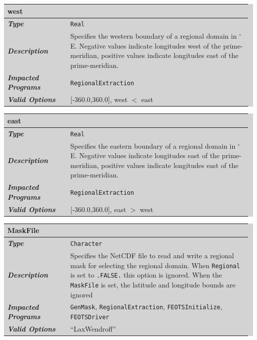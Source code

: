 \documentclass{softwaremanual}
\begin{document}

\noindent\begingroup\setlength{\fboxsep}{0pt}
\colorbox{lightgray}{
\begin{tabular}{p{0.25\linewidth} p{0.725\linewidth}}
\toprule
\textbf{west} & \\
\midrule
\textbf{\textit{Type}} & \texttt{Real} \\
\midrule
\textbf{\textit{Description}} & Specifies the western boundary of a regional domain in $^\circ$E. Negative values indicate longitudes west of the prime-meridian, positive values indicate longitudes east of the prime-meridian. \\
\midrule
\textbf{\textit{Impacted Programs}} & \texttt{RegionalExtraction} \\
\midrule
\textbf{\textit{Valid Options}}  & [-360.0,360.0], west $<$ east \\
\bottomrule
\end{tabular}
}\endgroup


\noindent\begingroup\setlength{\fboxsep}{0pt}
\colorbox{lightgray}{
\begin{tabular}{p{0.25\linewidth} p{0.725\linewidth}}
\toprule
\textbf{east} & \\
\midrule
\textbf{\textit{Type}} & \texttt{Real} \\
\midrule
\textbf{\textit{Description}} & Specifies the eastern boundary of a regional domain in $^\circ$E. Negative values indicate longitudes east of the prime-meridian, positive values indicate longitudes east of the prime-meridian. \\
\midrule
\textbf{\textit{Impacted Programs}} & \texttt{RegionalExtraction} \\
\midrule
\textbf{\textit{Valid Options}}  & [-360.0,360.0], east $>$ west \\
\bottomrule
\end{tabular}
}\endgroup

\noindent\begingroup\setlength{\fboxsep}{0pt}
\colorbox{lightgray}{
\begin{tabular}{p{0.25\linewidth} p{0.725\linewidth}}
\toprule
\textbf{MaskFile} & \\
\midrule
\textbf{\textit{Type}} & \texttt{Character} \\
\midrule
\textbf{\textit{Description}} & Specifies the NetCDF file to read and write a regional mask for selecting the regional domain. When \texttt{Regional} is set to \texttt{.FALSE.} this option is ignored. When the \texttt{MaskFile} is set, the latitude and longitude bounds are ignored  \\
\midrule
\textbf{\textit{Impacted Programs}} & \texttt{GenMask}, \texttt{RegionalExtraction}, \texttt{FEOTSInitialize}, \texttt{FEOTSDriver} \\
\midrule
\textbf{\textit{Valid Options}}  & ``LaxWendroff'' \\
\bottomrule
\end{tabular}
}\endgroup
\end{document}

